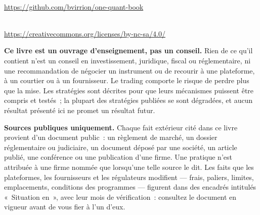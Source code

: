 \thispagestyle{empty}
\vspace*{\fill}
\begin{center}
\omcolophonsource\\[2pt]
\url{https://github.com/bvirrion/one-quant-book}

\bigskip
\omcolophonlicense\\[2pt]
\url{https://creativecommons.org/licenses/by-nc-sa/4.0/}\\[6pt]
\omcolophoncredit
\end{center}
\bigskip
\noindent\textbf{Ce livre est un ouvrage d'enseignement, pas un conseil.} Rien
de ce qu'il contient n'est un conseil en investissement, juridique, fiscal ou
réglementaire, ni une recommandation de négocier un instrument ou de recourir
à une plateforme, à un courtier ou à un fournisseur. Le trading comporte le
risque de perdre plus que la mise. Les stratégies sont décrites pour que leurs
mécanismes puissent être compris et testés~; la plupart des stratégies
publiées se sont dégradées, et aucun résultat présenté ici ne promet un
résultat futur.

\medskip
\noindent\textbf{Sources publiques uniquement.} Chaque fait extérieur cité
dans ce livre provient d'un document public~: un règlement de marché, un
dossier réglementaire ou judiciaire, un document déposé par une société, un
article publié, une conférence ou une publication d'une firme. Une pratique
n'est attribuée à une firme nommée que lorsqu'une telle source le dit. Les
faits que les plateformes, les fournisseurs et les régulateurs modifient ---
frais, paliers, limites, emplacements, conditions des programmes --- figurent
dans des encadrés intitulés «~Situation en~», avec leur mois de
vérification~: consultez le document en vigueur avant de vous fier à l'un
d'eux.
\vspace*{\fill}
\clearpage

